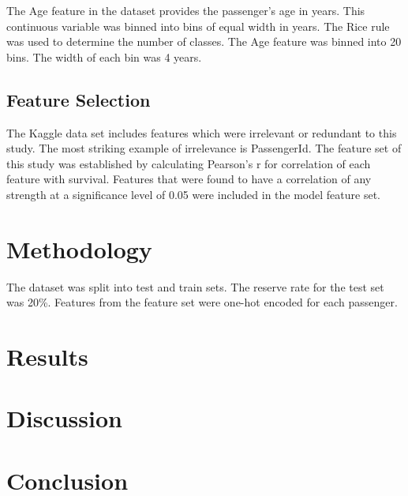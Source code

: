 \documentclass[10pt]{article}
\begin{document}
\begin{multicols}{2}
	The Age feature in the dataset provides the passenger's age in years.
	This continuous variable was binned into bins of equal width in years.
	The Rice rule was used to determine the number of classes.
	The Age feature was binned into 20 bins.
	The width of each bin was 4 years.


\subsection{Feature Selection}
	
	The Kaggle data set includes features which were irrelevant or redundant to this study.
	The most striking example of irrelevance is PassengerId.
	The feature set of this study was established by calculating Pearson's r for correlation of each feature with survival.
	Features that were found to have a correlation of any strength at a significance level of 0.05 were included in the model feature set.

\section{Methodology}

	The dataset was split into test and train sets. 
	The reserve rate for the test set was 20\%.
	Features from the feature set were one-hot encoded for each passenger.
\section{Results}

\section{Discussion}

\section{Conclusion}\label{conclusions}

\end{multicols}
\end{document}
